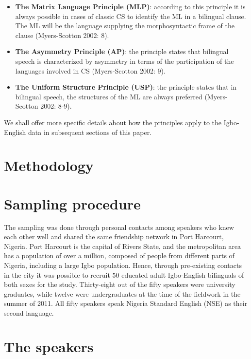 \documentclass[output=paper]{langsci/langscibook}
\begin{document}
\begin{itemize}
 \item \textbf{The Matrix Language Principle (MLP)}: according to this principle it is always possible in cases of classic CS to identify the ML in a bilingual clause. The ML will be the language supplying the morphosyntactic frame of the clause (Myers-Scotton 2002: 8). 

 \item \textbf{The Asymmetry Principle (AP)}: the principle states that bilingual speech is characterized by asymmetry in terms of the participation of the languages involved in CS (Myers-Scotton 2002: 9). 

 \item \textbf{The Uniform Structure Principle (USP)}: the principle states that in bilingual speech, the structures of the ML are always preferred (Myers-Scotton 2002: 8-9).

\end{itemize}
 
We shall offer more specific details about how the principles apply to the Igbo-English data in subsequent sections of this paper.

\section{Methodology}

\section{Sampling procedure}

The sampling was done through personal contacts among speakers who knew each other well and shared the same friendship network in Port Harcourt, Nigeria. Port Harcourt is the capital of Rivers State, and the metropolitan area has a population of over a million, composed of people from different parts of Nigeria, including a large Igbo population. Hence, through pre-existing contacts in the city it was possible to recruit 50 educated adult Igbo-English bilinguals of both sexes for the study. Thirty-eight out of the fifty speakers were university graduates, while twelve were undergraduates at the time of the fieldwork in the summer of 2011. All fifty speakers speak Nigeria Standard English (NSE) as their second language.

\section{The speakers}
\end{document}
